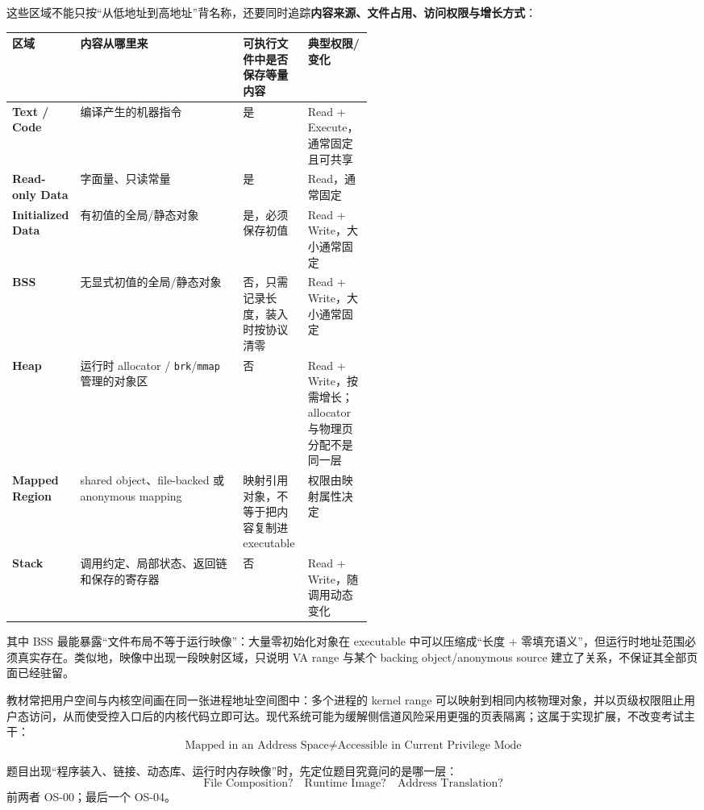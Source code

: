 \documentclass[11pt,a4paper]{ctexart}
\newcommand{\kw}[1]{\textbf{#1}}
\newcommand{\code}[1]{\texttt{#1}}
\begin{document}
这些区域不能只按“从低地址到高地址”背名称，还要同时追踪\kw{内容来源、文件占用、访问权限与增长方式}：

\begin{center}
\small
\renewcommand{\arraystretch}{1.25}
\begin{tabularx}{\linewidth}{>{\bfseries}p{0.16\linewidth} X p{0.18\linewidth} p{0.18\linewidth}}
\toprule
区域 & 内容从哪里来 & 可执行文件中是否保存等量内容 & 典型权限/变化\\
\midrule
Text / Code & 编译产生的机器指令 & 是 & Read + Execute，通常固定且可共享\\
Read-only Data & 字面量、只读常量 & 是 & Read，通常固定\\
Initialized Data & 有初值的全局/静态对象 & 是，必须保存初值 & Read + Write，大小通常固定\\
BSS & 无显式初值的全局/静态对象 & 否，只需记录长度，装入时按协议清零 & Read + Write，大小通常固定\\
Heap & 运行时 allocator / \code{brk}/\code{mmap} 管理的对象区 & 否 & Read + Write，按需增长；allocator 与物理页分配不是同一层\\
Mapped Region & shared object、file-backed 或 anonymous mapping & 映射引用对象，不等于把内容复制进 executable & 权限由映射属性决定\\
Stack & 调用约定、局部状态、返回链和保存的寄存器 & 否 & Read + Write，随调用动态变化\\
\bottomrule
\end{tabularx}
\end{center}

其中 BSS 最能暴露“文件布局不等于运行映像”：大量零初始化对象在 executable 中可以压缩成“长度 + 零填充语义”，但运行时地址范围必须真实存在。类似地，映像中出现一段映射区域，只说明 VA range 与某个 backing object/anonymous source 建立了关系，不保证其全部页面已经驻留。

教材常把用户空间与内核空间画在同一张进程地址空间图中：多个进程的 kernel range 可以映射到相同内核物理对象，并以页级权限阻止用户态访问，从而使受控入口后的内核代码立即可达。现代系统可能为缓解侧信道风险采用更强的页表隔离；这属于实现扩展，不改变考试主干：
\[
\boxed{\text{Mapped in an Address Space}\neq\text{Accessible in Current Privilege Mode}}
\]

\begin{exam}[考试第一动作]
题目出现“程序装入、链接、动态库、运行时内存映像”时，先定位题目究竟问的是哪一层：
\[
\boxed{\text{File Composition?}\quad\text{Runtime Image?}\quad\text{Address Translation?}}
\]
前两者 OS-00；最后一个 OS-04。
\end{exam}
\end{document}

